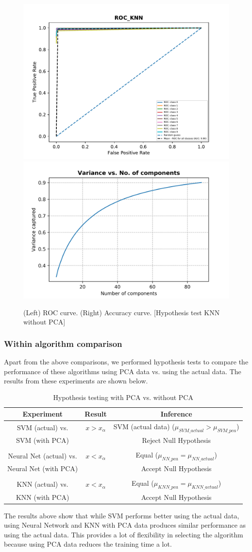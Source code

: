 \documentclass[10pt]{scrartcl}
\begin{document}
\begin{itemize}
\begin{figure}[H]
\centering
\includegraphics[width=0.45\linewidth]{figures/KNN_ROC_K_3_fold_1.pdf} 
\includegraphics[width=0.45\linewidth]{figures/pca_variance_vs_no_comp.png}
\caption{(Left) ROC curve. (Right) Accuracy curve. [Hypothesis test KNN without PCA] \label{fig:hypo_knn_roc_acc_act}}
\end{figure}

\end{itemize}

\subsubsection*{Within algorithm comparison}

Apart from the above comparisons, we performed hypothesis tests to compare the performance of these algorithms using PCA data vs. using the actual data. The results from these experiments are shown below. 

\begin{table}[H] 
\centering
\begin{tabular}{ c|c|c }
 \textbf{Experiment} & \textbf{Result} & \textbf{Inference} \\ 
 \hline
SVM (actual) vs. & $x > x_{\alpha}$ & SVM (actual data) ($\mu_{SVM\_actual} > \mu_{SVM\_pca}$) \\ 
SVM (with PCA) & & Reject Null Hypothesis \\ 
& & \\
Neural Net (actual) vs. & $x < x_{\alpha}$ &  Equal ($\mu_{NN\_pca} = \mu_{NN\_actual}$) \\
Neural Net (with PCA)  & & Accept Null Hypothesis\\ 
& & \\
KNN (actual) vs. & $x < x_{\alpha}$ &  Equal ($\mu_{KNN\_pca} = \mu_{KNN\_actual}$) \\
KNN (with PCA)  & & Accept Null Hypothesis\\ 
\end{tabular}
\caption{Hypothesis testing with PCA vs. without PCA \label{tab:hypo_pca_vs_act}}
\end{table}
 
The results above show that while SVM performs better using the actual data, using Neural Network and KNN with PCA data produces similar performance as using the actual data. This provides a lot of flexibility in selecting the algorithm because using PCA data reduces the training time a lot. 
 
\end{document}
